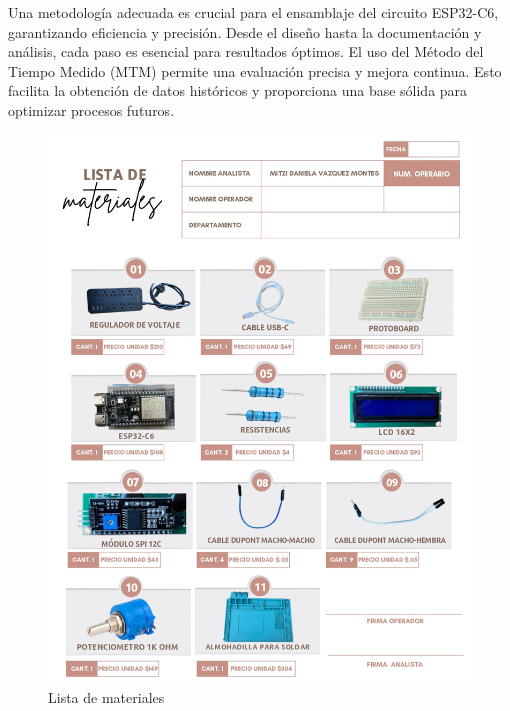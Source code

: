     Una metodología adecuada es crucial para el ensamblaje del circuito ESP32-C6, garantizando eficiencia y precisión. Desde el diseño hasta la documentación y análisis, cada paso es esencial para resultados óptimos. El uso del Método del Tiempo Medido (MTM) permite una evaluación precisa y mejora continua. Esto facilita la obtención de datos históricos y proporciona una base sólida para optimizar procesos futuros.
    \begin{figure}[H]
        \centering
        \includegraphics[trim = {1mm 1mm 1mm 1mm},clip,scale=0.2]{34/img/listaMateriales.png}
        \caption{Lista de materiales}
        \label{fig:enter-label1}
    \end{figure}
